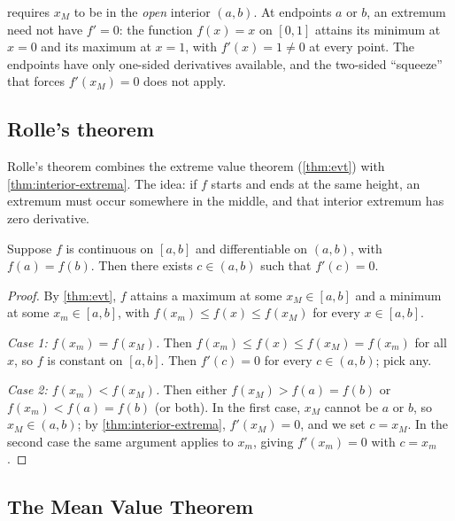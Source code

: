 \begin{caution}
 requires \(x_{M}\) to be in the \emph{open} interior \((a, b)\). At endpoints \(a\) or \(b\), an extremum need not have \(f' = 0\): the function \(f(x) = x\) on \([0, 1]\) attains its minimum at \(x = 0\) and its maximum at \(x = 1\), with \(f'(x) = 1 \neq 0\) at every point. The endpoints have only one-sided derivatives available, and the two-sided ``squeeze'' that forces \(f'(x_{M}) = 0\) does not apply.
\end{caution}

\subsection{Rolle's theorem}

Rolle's theorem combines the extreme value theorem (\cref{thm:evt}) with \cref{thm:interior-extrema}. The idea: if \(f\) starts and ends at the same height, an extremum must occur somewhere in the middle, and that interior extremum has zero derivative.

\begin{theorem}\label{thm:rolle}
Suppose \(f\) is continuous on \([a, b]\) and differentiable on \((a, b)\), with \(f(a) = f(b)\). Then there exists \(c \in (a, b)\) such that \(f'(c) = 0\).
\end{theorem}

\begin{proof}
By \cref{thm:evt}, \(f\) attains a maximum at some \(x_{M} \in [a, b]\) and a minimum at some \(x_{m} \in [a, b]\), with \(f(x_{m}) \leq f(x) \leq f(x_{M})\) for every \(x \in [a, b]\).

\emph{Case 1: \(f(x_{m}) = f(x_{M})\).} Then \(f(x_{m}) \leq f(x) \leq f(x_{M}) = f(x_{m})\) for all \(x\), so \(f\) is constant on \([a, b]\). Then \(f'(c) = 0\) for every \(c \in (a, b)\); pick any.

\emph{Case 2: \(f(x_{m}) < f(x_{M})\).} Then either \(f(x_{M}) > f(a) = f(b)\) or \(f(x_{m}) < f(a) = f(b)\) (or both). In the first case, \(x_{M}\) cannot be \(a\) or \(b\), so \(x_{M} \in (a, b)\); by \cref{thm:interior-extrema}, \(f'(x_{M}) = 0\), and we set \(c = x_{M}\). In the second case the same argument applies to \(x_{m}\), giving \(f'(x_{m}) = 0\) with \(c = x_{m}\).
\end{proof}

\subsection{The Mean Value Theorem}

